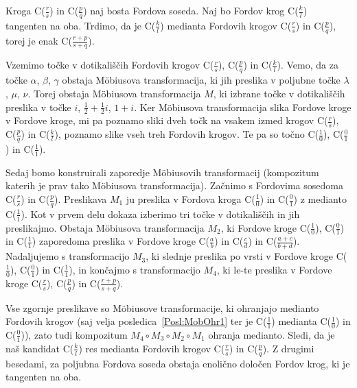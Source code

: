 \documentclass[mat1]{fmfdelo}
\begin{document}
\begin{dokaz}
Kroga C($\frac{r}{s}$) in C($\frac{p}{q}$) naj bosta Fordova soseda. Naj bo Fordov krog C($\frac{k}{l}$) tangenten na oba. Trdimo, da je C($\frac{k}{l}$) medianta Fordovih krogov C($\frac{r}{s}$) in C($\frac{p}{q}$), torej je enak C($\frac{r+p}{s+q}$).

Vzemimo točke v dotikališčih Fordovih krogov C($\frac{r}{s}$), C($\frac{p}{q}$) in C($\frac{k}{l}$). Vemo, da za točke $\alpha$, $\beta$, $\gamma$ obstaja M\"{o}biusova transformacija, ki jih preslika v poljubne točke $\lambda$, $\mu$, $\nu$. Torej obstaja M\"{o}biusova transformacija $M$, ki izbrane točke v dotikališčih preslika v točke $i$, $\frac{1}{2}+\frac{1}{2}i$, $1+i$. Ker M\"{o}biusova transformacija slika Fordove kroge v Fordove kroge, mi pa poznamo sliki dveh točk na vsakem izmed krogov C($\frac{r}{s}$), C($\frac{p}{q}$) in C($\frac{k}{l}$), poznamo slike vseh treh Fordovih krogov. Te pa so točno C($\frac{1}{0}$), C($\frac{0}{1}$) in C($\frac{1}{1}$).

Sedaj bomo konstruirali zaporedje M\"{o}biusovih transformacij (kompozitum katerih je prav tako M\"{o}biusova transformacija). Začnimo s Fordovima sosedoma C($\frac{r}{s}$) in C($\frac{p}{q}$). Preslikava $M_{1}$ ju preslika v Fordova kroga C($\frac{1}{0}$) in C($\frac{0}{1}$) z medianto C($\frac{1}{1}$). Kot v prvem delu dokaza izberimo tri točke v dotikališčih in jih preslikajmo. Obstaja M\"{o}biusova transformacija $M_{2}$, ki Fordove kroge C($\frac{1}{0}$), C($\frac{0}{1}$) in C($\frac{1}{1}$) zaporedoma preslika v Fordove kroge C($\frac{a}{b}$) in C($\frac{c}{d}$) in C($\frac{a+c}{b+d}$). Nadaljujemo s transformacijo $M_{3}$, ki slednje preslika po vrsti v Fordove kroge C($\frac{1}{0}$), C($\frac{0}{1}$) in C($\frac{1}{1}$), in končajmo s transformacijo $M_{4}$, ki le-te preslika v Fordove kroge C($\frac{r}{s}$), C($\frac{p}{q}$) in C($\frac{r+p}{s+q}$).

Vse zgornje preslikave so M\"{o}biusove transformacije, ki ohranjajo medianto Fordovih krogov (saj velja posledica~\ref{Posl:MobOhr1} ter je C($\frac{1}{1}$) medianta C($\frac{1}{0}$) in C($\frac{0}{1}$)), zato tudi kompozitum $M_{4} \circ M_{3} \circ M_{2} \circ M_{1}$ ohranja medianto. Sledi, da je naš kandidat C($\frac{k}{l}$) res medianta Fordovih krogov C($\frac{r}{s}$) in C($\frac{p}{q}$). Z drugimi besedami, za poljubna Fordova soseda obstaja enolično določen Fordov krog, ki je tangenten na oba.
\end{dokaz}
\end{document}

